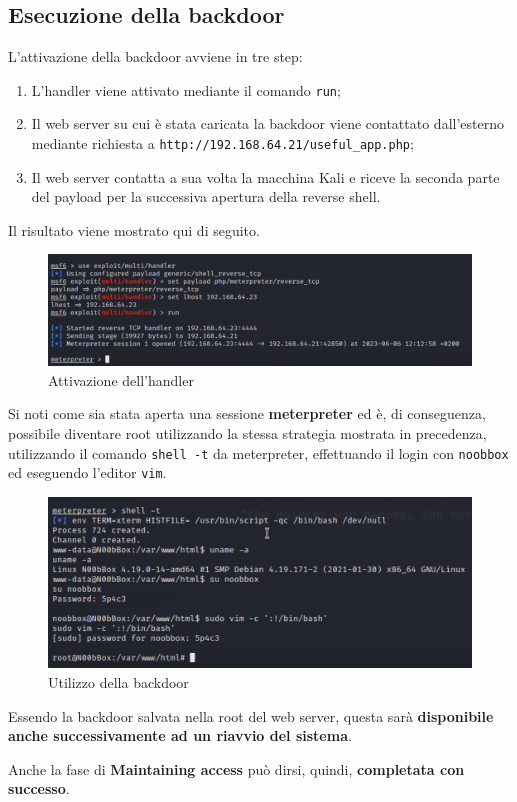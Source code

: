 \documentclass[a4paper, 12pt, oneside]{article}
\begin{document}
\subsection{Esecuzione della backdoor}

L'attivazione della backdoor avviene in tre step:

\begin{enumerate}
    \item L'handler viene attivato mediante il comando \texttt{run};
    \item Il web server su cui è stata caricata la backdoor viene contattato dall'esterno mediante richiesta a \texttt{http://192.168.64.21/useful\_app.php};
    \item Il web server contatta a sua volta la macchina Kali e riceve la seconda parte del payload per la successiva apertura della reverse shell.
\end{enumerate}

Il risultato viene mostrato qui di seguito.

\begin{figure}[h!]
    \centering
    \includegraphics[width=\textwidth]{img/handler.png}
    \caption{Attivazione dell'handler}
\end{figure}

Si noti come sia stata aperta una sessione \textbf{meterpreter} ed è, di conseguenza, possibile diventare root utilizzando la stessa strategia mostrata in precedenza, utilizzando il comando \texttt{shell -t} da meterpreter, effettuando il login con \texttt{noobbox} ed eseguendo l'editor \texttt{vim}.

\newpage
\begin{figure}[h!]
    \centering
    \includegraphics[width=\textwidth]{img/backdoor_root.png}
    \caption{Utilizzo della backdoor}
\end{figure}

Essendo la backdoor salvata nella root del web server, questa sarà \textbf{disponibile anche successivamente ad un riavvio del sistema}.

Anche la fase di \textbf{Maintaining access} può dirsi, quindi, \textbf{completata con successo}.

\newpage
\printbibliography[title={Riferimenti bibliografici e risorse consultate}]
\end{document}
